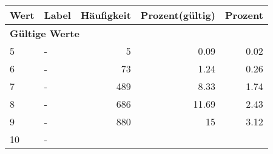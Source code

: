      \begin{longtable}{lXrrr}
     \toprule
     \textbf{Wert} & \textbf{Label} & \textbf{Häufigkeit} & \textbf{Prozent(gültig)} & \textbf{Prozent} \\
     \endhead
     \midrule
     \multicolumn{5}{l}{\textbf{Gültige Werte}}\\

     5 &
     \multicolumn{1}{X}{ -  } &


       \num{5} &
       \num[round-mode=places,round-precision=2]{0.09} &
         \num[round-mode=places,round-precision=2]{0.02} \\

     6 &
     \multicolumn{1}{X}{ -  } &


       \num{73} &
       \num[round-mode=places,round-precision=2]{1.24} &
         \num[round-mode=places,round-precision=2]{0.26} \\

     7 &
     \multicolumn{1}{X}{ -  } &


       \num{489} &
       \num[round-mode=places,round-precision=2]{8.33} &
         \num[round-mode=places,round-precision=2]{1.74} \\

     8 &
     \multicolumn{1}{X}{ -  } &


       \num{686} &
       \num[round-mode=places,round-precision=2]{11.69} &
         \num[round-mode=places,round-precision=2]{2.43} \\

     9 &
     \multicolumn{1}{X}{ -  } &


       \num{880} &
       \num[round-mode=places,round-precision=2]{15} &
         \num[round-mode=places,round-precision=2]{3.12} \\

     10 &
     \multicolumn{1}{X}{ -  } &



\end{longtable}
